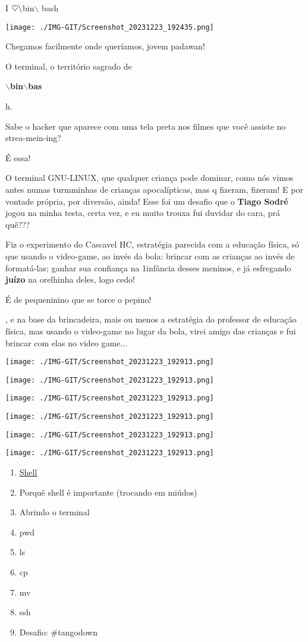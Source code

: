 \begin{center}
	{\huge I $\heartsuit\space  \backslash$bin$\backslash$ bash}
	

	\texttt{[image: ./IMG-GIT/Screenshot\_20231223\_192435.png]}
\end{center}
	
	\vfill
\pagebreak

Chegamos facilmente onde queríamos, jovem padawan!

O terminal, o território sagrado de {
	
	\Large
	
	\textbf{$\backslash$bin$\backslash$bas}}h.

Sabe o hacker que aparece com uma tela preta nos filmes que você assiste no strea-mein-ing?

É essa!

O terminal GNU-LINUX, que qualquer criança pode dominar, como nós vimos antes numas turmminhas de crianças apocalípticas, mas q fizeram, fizeram! E por vontade própria, por diversão, ainda! Esse foi um desafio que o \textbf{Tiago Sodré} jogou na minha testa, certa vez, e eu muito trouxa fui duvidar do cara, prá quê???

Fiz o experimento do Cascavel HC, estratégia parecida com a educação física, só que usando o video-game, ao invés da bola: brincar com as crianças ao invés de formatá-las; ganhar sua confiança na 1\textordfeminine infância desses meninos, e já esfregando \textbf{juízo} na orelhinha deles, logo cedo! 

É de pequeninino que se torce o pepino!

, e na base da brincadeira, mais ou menos a estratégia do professor de educação física, mas usando o video-game no lugar da bola, virei amigo das crianças e fui brincar com elas no video game... 
	
	\texttt{[image: ./IMG-GIT/Screenshot\_20231223\_192913.png]}
		
		\texttt{[image: ./IMG-GIT/Screenshot\_20231223\_192913.png]}
			
			\texttt{[image: ./IMG-GIT/Screenshot\_20231223\_192913.png]}
				
				\texttt{[image: ./IMG-GIT/Screenshot\_20231223\_192913.png]}
					
					\texttt{[image: ./IMG-GIT/Screenshot\_20231223\_192913.png]}
						
						\texttt{[image: ./IMG-GIT/Screenshot\_20231223\_192913.png]}


\begin{enumerate}
	\item \href{https://guialinux.uniriotec.br/shell/}{Shell}
	\item Porquê shell é importante (trocando em miúdos)
	\item Abrindo o terminal
	\item pwd
	\item ls
	\item cp
	\item mv
	\item ssh
	\item Desafio: \#tangodown
\end{enumerate}

\vfill\null\columnbreak